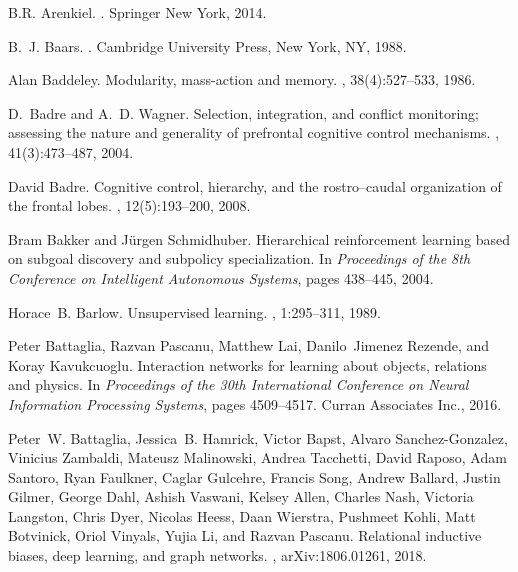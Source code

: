 \documentclass[letterpaper,11pt]{article}
\begin{document}
\begin{thebibliography}{100}
B.R. Arenkiel.
.
\newblock Springer New York, 2014.

B.~J. Baars.
.
\newblock Cambridge University Press, New York, NY, 1988.

Alan Baddeley.
\newblock Modularity, mass-action and memory.
,
  38(4):527--533, 1986.

D.~Badre and A.~D. Wagner.
\newblock Selection, integration, and conflict monitoring; assessing the nature
  and generality of prefrontal cognitive control mechanisms.
, 41(3):473--487, 2004.

David Badre.
\newblock Cognitive control, hierarchy, and the rostro–caudal organization of
  the frontal lobes.
, 12(5):193--200, 2008.

Bram Bakker and J\"{u}rgen Schmidhuber.
\newblock Hierarchical reinforcement learning based on subgoal discovery and
  subpolicy specialization.
\newblock In {\em Proceedings of the 8th Conference on Intelligent Autonomous
  Systems}, pages 438--445, 2004.

Horace~B. Barlow.
\newblock Unsupervised learning.
, 1:295--311, 1989.

Peter Battaglia, Razvan Pascanu, Matthew Lai, Danilo~Jimenez Rezende, and Koray
  Kavukcuoglu.
\newblock Interaction networks for learning about objects, relations and
  physics.
\newblock In {\em Proceedings of the 30th International Conference on Neural
  Information Processing Systems}, pages 4509--4517. Curran Associates Inc.,
  2016.

Peter~W. Battaglia, Jessica~B. Hamrick, Victor Bapst, Alvaro Sanchez-Gonzalez,
  Vinicius Zambaldi, Mateusz Malinowski, Andrea Tacchetti, David Raposo, Adam
  Santoro, Ryan Faulkner, Caglar Gulcehre, Francis Song, Andrew Ballard, Justin
  Gilmer, George Dahl, Ashish Vaswani, Kelsey Allen, Charles Nash, Victoria
  Langston, Chris Dyer, Nicolas Heess, Daan Wierstra, Pushmeet Kohli, Matt
  Botvinick, Oriol Vinyals, Yujia Li, and Razvan Pascanu.
\newblock Relational inductive biases, deep learning, and graph networks.
, arXiv:1806.01261, 2018.


\end{thebibliography}
\end{document}
